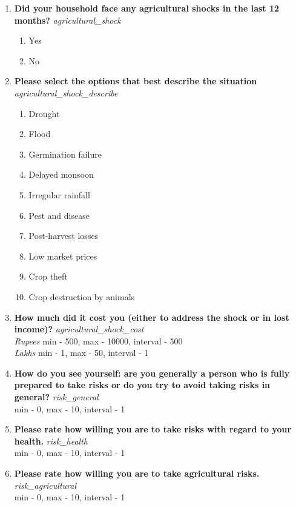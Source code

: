 \documentclass{article}
\begin{document}
\begin{enumerate}
\item {\bfseries Did your household face any agricultural shocks in the last 12 months?}\emph{ agricultural\_shock }
\begin{enumerate}
\item Yes
\item No
\end{enumerate}
\item {\bfseries Please select the options that best describe the situation}\emph{ agricultural\_shock\_describe }
\begin{enumerate}
\item Drought
\item Flood
\item Germination failure
\item Delayed monsoon
\item Irregular rainfall
\item Pest and disease
\item Post-harvest losses
\item Low market prices
\item Crop theft
\item Crop destruction by animals
\end{enumerate}
\item {\bfseries How much did it cost you (either to address the shock or in lost income)?}\emph{ agricultural\_shock\_cost }
\\ \emph{ Rupees }min - 500, max - 10000, interval - 500
\\ \emph{ Lakhs }min - 1, max - 50, interval - 1

\item {\bfseries How do you see yourself: are you generally a person who is fully prepared to take risks or do you try to avoid taking risks in general?}\emph{ risk\_general }
\\min - 0, max - 10, interval - 1

\item {\bfseries Please rate how willing you are to take risks with regard to your health.}\emph{ risk\_health }
\\min - 0, max - 10, interval - 1

\item {\bfseries Please rate how willing you are to take agricultural risks.}\emph{ risk\_agricultural }
\\min - 0, max - 10, interval - 1


\end{enumerate}
\end{document}
